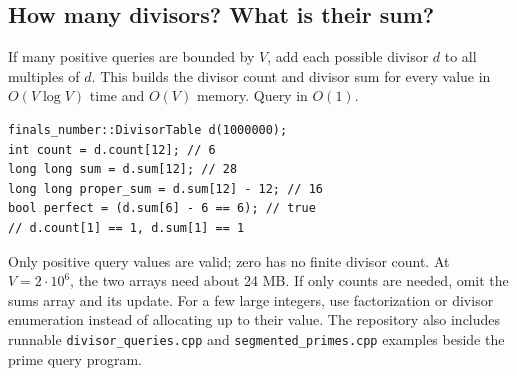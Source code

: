 \subsection{How many divisors? What is their sum?}
If many positive queries are bounded by $V$, add each possible divisor $d$
to all multiples of $d$. This builds the divisor count and divisor sum for
every value in $O(V\log V)$ time and $O(V)$ memory. Query in $O(1)$.
\begin{lstlisting}
finals_number::DivisorTable d(1000000);
int count = d.count[12]; // 6
long long sum = d.sum[12]; // 28
long long proper_sum = d.sum[12] - 12; // 16
bool perfect = (d.sum[6] - 6 == 6); // true
// d.count[1] == 1, d.sum[1] == 1
\end{lstlisting}
Only positive query values are valid; zero has no finite divisor count.
At $V=2\cdot10^6$, the two arrays need about 24 MB. If only counts are
needed, omit the sums array and its update. For a few large integers, use
factorization or divisor enumeration instead of allocating up to their value.
The repository also includes runnable \texttt{divisor\_queries.cpp} and
\texttt{segmented\_primes.cpp} examples beside the prime query program.
